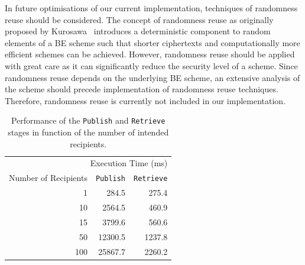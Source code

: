 In future optimisations of our current implementation, techniques of randomness reuse should be considered. The concept of randomness reuse as originally proposed by Kurosawa~\cite{art:Kurosawa01} introduces a deterministic component to random elements of a BE scheme such that shorter ciphertexts and computationally more efficient schemes can be achieved. However, randomness reuse should be applied with great care as it can significantly reduce the security level of a scheme. Since randomness reuse depends on the underlying BE scheme, an extensive analysis of the scheme should precede implementation of randomness reuse techniques. Therefore, randomness reuse is currently not included in our implementation.

\begin{table}
  \centering
  \begin{tabular}{@{}rrr@{}} \toprule
    \multicolumn{3}{r}{Execution Time (ms)} \\ \cmidrule(r){2-3}
    Number of Recipients & \texttt{Publish} & \texttt{Retrieve} \\ \midrule
    1 & 284.5 & 275.4  \\
    10 & 2564.5  & 460.9  \\
    15 & 3799.6  & 560.6  \\
    50 & 12300.5  & 1237.8  \\
    100 & 25867.7  & 2260.2  \\  \bottomrule
  \end{tabular}
  \caption{Performance of the \texttt{Publish} and \texttt{Retrieve} stages in function of the number of intended recipients.}
  \label{table:performance_publish_and_retrieve}
\end{table}

